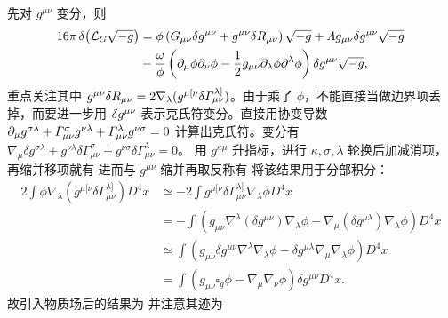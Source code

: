 先对 $g^{\mu\nu}$ 变分，则
\begin{align*}
    16\pi \var(\mathcal L_G\sqrt{-g})&=\phi\left( G_{\mu\nu} \var g^{\mu\nu}+g^{\mu\nu}\var R_{\mu\nu}\right) \sqrt{-g}+ \Lambda g_{\mu\nu} \var g^{\mu\nu}\sqrt{-g}\\
&-\frac{\omega}{\phi}\left(\partial_\mu\phi \partial_\nu\phi-\frac 12 g_{\mu\nu}\partial_\lambda \phi \partial^\lambda\phi\right)\var g^{\mu\nu}\sqrt{-g},
\end{align*}
重点关注其中 $g^{\mu\nu}\var R_{\mu\nu}=2\nabla_\lambda(g^{\mu [\nu} \delta \Gamma_{\mu \nu}^{\lambda]})$。由于乘了 $\phi$，不能直接当做边界项丢掉，而要进一步用 $\var g^{\mu\nu}$ 表示克氏符变分。直接用协变导数 $\partial_\mu g^{\sigma\lambda}+\Gamma^\sigma_{\mu\nu} g^{\nu\lambda}+\Gamma^\lambda_{\mu\nu} g^{\nu\sigma}=0$ 计算出克氏符。变分有 $\nabla_\mu \delta g^{\sigma\lambda}+g^{\nu\lambda}\delta \Gamma^\sigma_{\mu\nu} +g^{\nu\sigma}\delta \Gamma^\lambda_{\mu\nu} =0$。
用 $g^{\kappa\mu}$ 升指标，进行 $\kappa,\sigma,\lambda$ 轮换后加减消项，再缩并移项就有
进而与 $g^{\mu\nu}$ 缩并再取反称有
将该结果用于分部积分：
\begin{align*}
    2\int \phi \nabla_\lambda(g^{\mu [\nu} \delta \Gamma_{\mu \nu}^{\lambda]}) D^4x &\simeq -2\int  g^{\mu [\nu} \delta \Gamma_{\mu \nu}^{\lambda]} \nabla_\lambda \phi D^4x\\
    &= -\int  (g_{\mu\nu}\nabla^\lambda (\delta g^{\mu\nu})\nabla_\lambda \phi - \nabla_\mu(\delta g^{\mu\lambda}) \nabla_\lambda \phi)  D^4x\\
    &\simeq \int  (g_{\mu\nu} \delta g^{\mu\nu}\nabla^\lambda \nabla_\lambda \phi - \delta g^{\mu\lambda} \nabla_\mu\nabla_\lambda \phi)  D^4x\\
    &=\int  (g_{\mu\nu} \square_g \phi - \nabla_\mu\nabla_\nu \phi) \delta g^{\mu\nu} D^4x.
\end{align*}
故引入物质场后的结果为
并注意其迹为

